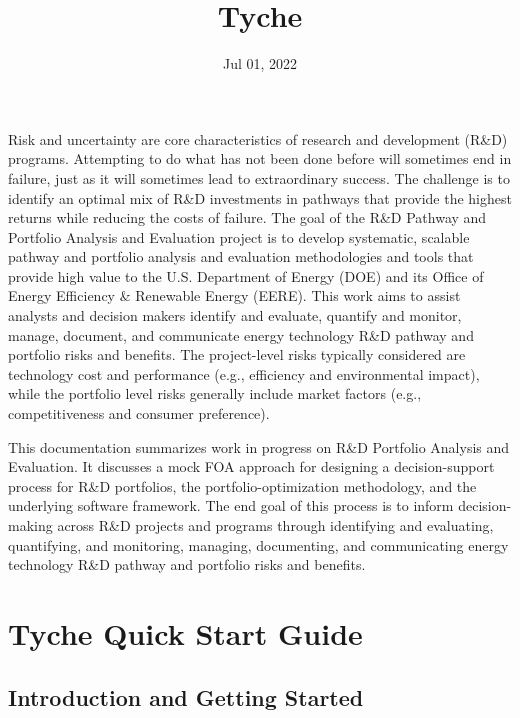 \documentclass[letterpaper,10pt,english]{sphinxmanual}
\title{Tyche}
\date{Jul 01, 2022}
\author{}
\begin{document}
\pagestyle{empty}
\sphinxmaketitle
\pagestyle{plain}
\sphinxtableofcontents
\pagestyle{normal}
\label{\detokenize{main_page::doc}}


Risk and uncertainty are core characteristics of research and development (R\&D) programs. Attempting to do what has not been done before will sometimes end in failure, just as it will sometimes lead to extraordinary success. The challenge is to identify an optimal mix of R\&D investments in pathways that provide the highest returns while reducing the costs of failure. The goal of the R\&D Pathway and Portfolio Analysis and Evaluation project is to develop systematic, scalable pathway and portfolio analysis and evaluation methodologies and tools that provide high value to the U.S. Department of Energy (DOE) and its Office of Energy Efficiency \& Renewable Energy (EERE). This work aims to assist analysts and decision makers identify and evaluate, quantify and monitor, manage, document, and communicate energy technology R\&D pathway and portfolio risks and benefits. The project-level risks typically considered are technology cost and performance (e.g., efficiency and environmental impact), while the portfolio level risks generally include market factors (e.g., competitiveness and consumer preference).

This documentation summarizes work in progress on R\&D Portfolio Analysis and Evaluation. It discusses a mock FOA approach for designing a decision-support process for R\&D portfolios, the portfolio-optimization methodology, and the underlying software framework. The end goal of this process is to inform decision-making across R\&D projects and programs through identifying and evaluating, quantifying, and monitoring, managing, documenting, and communicating energy technology R\&D pathway and portfolio risks and benefits.


\chapter{Tyche Quick Start Guide}
\label{\detokenize{cheat-sheet:tyche-quick-start-guide}}\label{\detokenize{cheat-sheet::doc}}

\section{Introduction and Getting Started}
\label{\detokenize{cheat-sheet:introduction-and-getting-started}}
\end{document}
